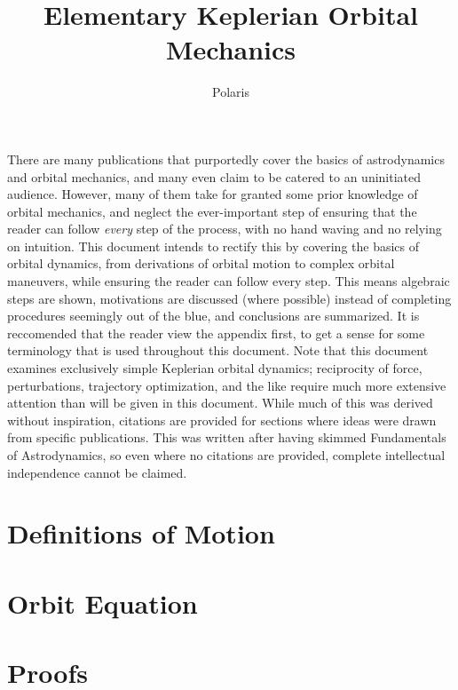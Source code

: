 \documentclass{article}
\title{Elementary Keplerian Orbital Mechanics}
\author{Polaris}
\date{}
\begin{document}
\maketitle

There are many publications that purportedly cover the basics of astrodynamics and orbital mechanics, and many even claim to be catered to an uninitiated audience. However, many of them take for granted some prior knowledge of orbital mechanics, and neglect the ever-important step of ensuring that the reader can follow \textit{every} step of the process, with no hand waving and no relying on intuition. This document intends to rectify this by covering the basics of orbital dynamics, from derivations of orbital motion to complex orbital maneuvers, while ensuring the reader can follow every step. This means algebraic steps are shown, motivations are discussed (where possible) instead of completing procedures seemingly out of the blue, and conclusions are summarized. It is reccomended that the reader view the appendix first, to get a sense for some terminology that is used throughout this document. Note that this document examines exclusively simple Keplerian orbital dynamics; reciprocity of force, perturbations, trajectory optimization, and the like require much more extensive attention than will be given in this document. While much of this was derived without inspiration, citations are provided for sections where ideas were drawn from specific publications. This was written after having skimmed Fundamentals of Astrodynamics\cite{Bate_Mueller_White_1971}, so even where no citations are provided, complete intellectual independence cannot be claimed.

\pagebreak
\tableofcontents

\pagebreak
\section{Definitions of Motion}\label{Sec:Motion}


\pagebreak
\section{Orbit Equation}\label{Sec:Orbit Equation}


\pagebreak
\section{Proofs}\label{sec:Proofs}

\end{document}
